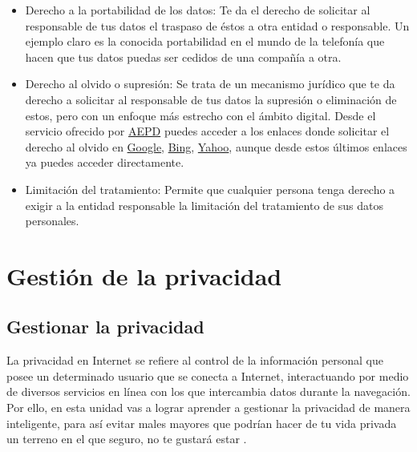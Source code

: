 \documentclass[
  a4paper,
  openany]{book}
\begin{document}
\begin{itemize}
\item
  Derecho a la portabilidad de los datos: Te da el derecho de solicitar al responsable de tus datos el traspaso de éstos a otra entidad o responsable. Un ejemplo claro es la conocida portabilidad en el mundo de la telefonía que hacen que tus datos puedas ser cedidos de una compañía a otra.
\item
  Derecho al olvido o supresión: Se trata de un mecanismo jurídico que te da derecho a solicitar al responsable de tus datos la supresión o eliminación de estos, pero con un enfoque más estrecho con el ámbito digital. Desde el servicio ofrecido por \href{https://www.aepd.es/es/areas-de-actuacion/internet-y-redes-sociales/derecho-al-olvido}{AEPD} puedes acceder a los enlaces donde solicitar el derecho al olvido en \href{https://www.google.com/webmasters/tools/legal-removal-request?complaint_type=rtbf\&visit_id=637490694757326412-3626204680\&hl=es\&rd=1}{Google}, \href{https://www.bing.com/webmaster/tools/eu-privacy-request}{Bing}, \href{https://es.ayuda.yahoo.com/kb/Solicitud-para-bloquear-resultados-de-b\%C3\%BAsqueda-en-Yahoo-Search-Recursos-para-Residentes-Europeos-sln28252.html?guccounter=1\&guce_referrer=aHR0cHM6Ly93d3cuYWVwZC5lcy8\&guce_referrer_sig=AQAAAIRquvv_VPnIiAOniwOvZi_iVodzBg6yn2C0sGApxESxJWBR6RMqeNq89qO01lmI0UdIKSr3ivLxST8cTDrgIMQRF9FIda60jZQ16f8q85f-eqLvvviA02B_fephtV40QIGV7aQ8Uw0M7f_poDUONOrmeKQzbahKvnuKZCoBDBFQ}{Yahoo}, aunque desde estos últimos enlaces ya puedes acceder directamente.
\item
  Limitación del tratamiento: Permite que cualquier persona tenga derecho a exigir a la entidad responsable la limitación del tratamiento de sus datos personales.
\end{itemize}

\hypertarget{gestiuxf3n-de-la-privacidad}{%
\chapter{Gestión de la privacidad}\label{gestiuxf3n-de-la-privacidad}}

\hypertarget{gestionar-la-privacidad}{%
\section{Gestionar la privacidad}\label{gestionar-la-privacidad}}

La privacidad en Internet se refiere al control de la información personal que posee un determinado usuario que se conecta a Internet, interactuando por medio de diversos servicios en línea con los que intercambia datos durante la navegación. Por ello, en esta unidad vas a lograr aprender a gestionar la privacidad de manera inteligente, para así evitar males mayores que podrían hacer de tu vida privada un terreno en el que seguro, no te gustará estar \citep{WIKI-privacidad}.
\end{document}
